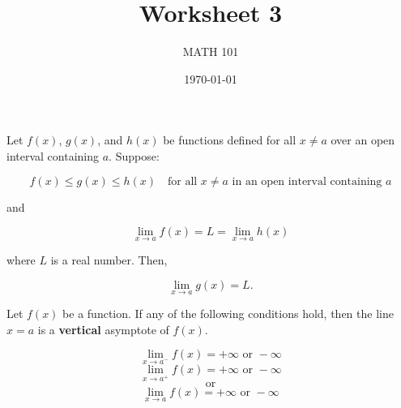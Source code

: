 \documentclass[12pt]{amsart}
\title{ Worksheet 3 }
\author{MATH 101}
\date{\today}
\begin{document}
\maketitle
\begin{theorem}
	Let \( f(x) \), \( g(x) \), and \( h(x) \) be functions defined for all \( x \neq a \) over an open interval containing \( a \). Suppose:

	\[
		f(x) \leq g(x) \leq h(x) \quad \text{for all } x \neq a \text{ in an open interval containing } a
	\]

	and

	\[
		\lim_{x \to a} f(x) = L = \lim_{x \to a} h(x)
	\]

	where \( L \) is a real number. Then,

	\[
		\lim_{x \to a} g(x) = L.
	\]
\end{theorem}

\begin{definition}
	Let \( f(x) \) be a function. If any of the following conditions hold, then the line \( x = a \) is a \textbf{vertical} asymptote of \( f(x) \).

	\[
		\lim_{x \to a^-} f(x) = +\infty \text{ or } -\infty
	\]
	\[
		\lim_{x \to a^+} f(x) = +\infty \text{ or } -\infty
	\]
	\[
		\text{or}
	\]
	\[
		\lim_{x \to a} f(x) = +\infty \text{ or } -\infty
	\]
\end{definition}
\printbibliography
%
%
\end{document}
